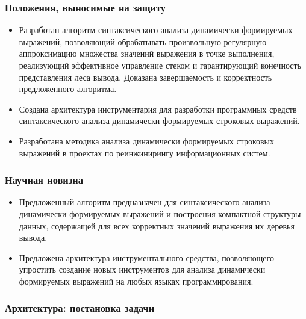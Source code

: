 \documentclass{beamer}
\begin{document}
\begin{frame}
    \transwipe[direction=90]
    \frametitle{Положения, выносимые на защиту}
        \begin{itemize}
            \item Разработан алгоритм синтаксического анализа динамически формируемых выражений, позволяющий обрабатывать произвольную регулярную аппроксимацию множества значений выражения в точке выполнения, реализующий эффективное управление стеком и гарантирующий конечность представления леса вывода. Доказана завершаемость и корректность предложенного алгоритма.
            \item Создана архитектура инструментария для разработки программных средств синтаксического анализа динамически формируемых строковых выражений.
            \item Разработана методика анализа динамически формируемых строковых выражений в проектах по реинжинирингу информационных систем.  
        \end{itemize}
\end{frame}

\begin{frame}
    \transwipe[direction=90]
    \frametitle{Научная новизна}
    \begin{itemize}
        \item Предложенный алгоритм предназначен для синтаксического анализа динамически формируемых выражений и построения компактной структуры данных, содержащей для всех корректных значений выражения их деревья вывода.
        \item Предложена архитектура инструментального средства, позволяющего упростить создание новых инструментов для анализа динамически формируемых выражений на любых языках программирования.
    \end{itemize}
\end{frame}

\begin{frame}
    \transwipe[direction=90]
    \frametitle{Архитектура: постановка задачи}
\end{frame}
\end{document}

